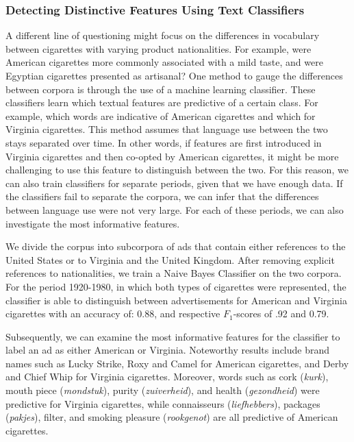 \documentclass[USenglish]{article}
\begin{document}
\subsubsection{Detecting Distinctive Features Using Text Classifiers}
A different line of questioning might focus on the differences in vocabulary between cigarettes with varying product nationalities. For example, were American cigarettes more commonly associated with a mild taste, and were Egyptian cigarettes presented as artisanal? 
%
One method to gauge the differences between corpora is through the use of a machine learning classifier. These classifiers learn which textual features are predictive of a certain class. For example, which words are indicative of American cigarettes and which for Virginia cigarettes. This method assumes that language use between the two stays separated over time. In other words, if features are first introduced in Virginia cigarettes and then co-opted by American cigarettes, it might be more challenging to use this feature to distinguish between the two. For this reason, we can also train classifiers for separate periods, given that we have enough data. If the classifiers fail to separate the corpora, we can infer that the differences between language use were not very large. For each of these periods, we can also investigate the most informative features. 

We divide the corpus into subcorpora of ads that contain either references to the United States or to Virginia and the United Kingdom. After removing explicit references to nationalities, we train a Naive Bayes Classifier on the two corpora. For the period 1920-1980, in which both types of cigarettes were represented, the classifier is able to distinguish between advertisements for American and Virginia cigarettes with an accuracy of: 0.88, and respective $F_{1}$-scores of .92 and 0.79.  

Subsequently, we can examine the most informative features for the classifier to label an ad as either American or Virginia. Noteworthy results include brand names such as Lucky Strike, Roxy and Camel for American cigarettes, and Derby and Chief Whip for Virginia cigarettes. Moreover, words such as cork (\textit{kurk}), mouth piece (\textit{mondstuk}), purity (\textit{zuiverheid}), and health (\textit{gezondheid}) were predictive for Virginia cigarettes, while connaisseurs (\textit{liefhebbers}), packages (\textit{pakjes}), filter, and smoking pleasure (\textit{rookgenot}) are all predictive of American cigarettes.
\end{document}
